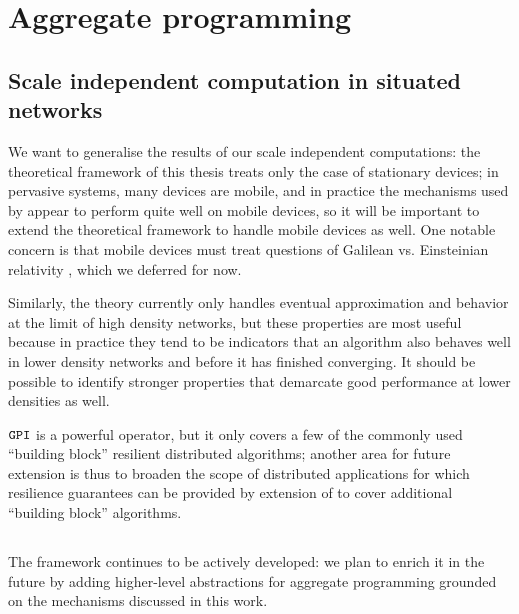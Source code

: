 \documentclass[12pt,a4paper,twoside,openright]{book}
\begin{document}
\section{Aggregate programming}

\subsection{Scale independent computation in situated networks}
We want to generalise the results of our scale independent computations: the theoretical framework of this thesis treats only the case of stationary devices; in pervasive systems, many devices are mobile, and in practice the mechanisms used by \calculus{} appear to perform quite well on mobile devices, so it will be important to extend the theoretical framework
to handle mobile devices as well.
%
One notable concern is that mobile devices must treat questions of Galilean vs. Einsteinian relativity \cite{RelativityIntroduction}, which we deferred for now.

Similarly, the theory currently only handles eventual approximation and behavior at the limit of high density networks, but these properties are most useful because in practice they tend to be indicators that an algorithm also behaves well in lower density networks and before it has finished converging.  It should be possible to identify stronger properties that demarcate good performance at lower densities as well.

$\texttt{GPI}$ is a powerful operator, but it only covers a few of the commonly used ``building block'' resilient distributed algorithms; another area for future extension is thus to broaden the scope of distributed applications for which resilience guarantees can be provided by extension of \calculus{} to cover additional ``building block'' algorithms.

\subsection{\protelis{}}

The \protelis{} framework continues to be actively developed: we plan to enrich it in the future by adding higher-level abstractions for aggregate programming grounded on the mechanisms discussed in this work.
\end{document}
